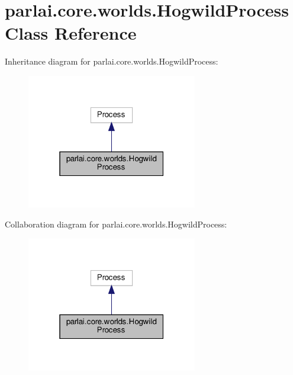 \hypertarget{classparlai_1_1core_1_1worlds_1_1HogwildProcess}{}\section{parlai.\+core.\+worlds.\+Hogwild\+Process Class Reference}
\label{classparlai_1_1core_1_1worlds_1_1HogwildProcess}


Inheritance diagram for parlai.\+core.\+worlds.\+Hogwild\+Process\+:
\nopagebreak
\begin{figure}[H]
\begin{center}
\leavevmode
\includegraphics[width=211pt]{classparlai_1_1core_1_1worlds_1_1HogwildProcess__inherit__graph}
\end{center}
\end{figure}


Collaboration diagram for parlai.\+core.\+worlds.\+Hogwild\+Process\+:
\nopagebreak
\begin{figure}[H]
\begin{center}
\leavevmode
\includegraphics[width=211pt]{classparlai_1_1core_1_1worlds_1_1HogwildProcess__coll__graph}
\end{center}
\end{figure}
